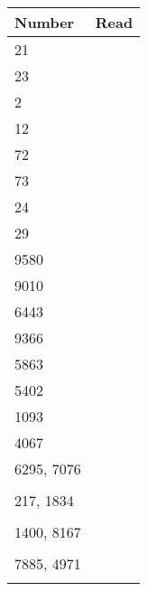 \documentclass[24pt]{article}
\begin{document}
    {
    \Large
    \begin{tabular}{ l|p{15cm} }
    
    \toprule
    Number & Read \\
    \midrule
    21 & \hfill \\
\midrule
23 & \hfill \\
\midrule
2 & \hfill \\
\midrule
12 & \hfill \\
\midrule
72 & \hfill \\
\midrule
73 & \hfill \\
\midrule
24 & \hfill \\
\midrule
29 & \hfill \\
\midrule
9580 & \hfill \\
\midrule
9010 & \hfill \\
\midrule
6443 & \hfill \\
\midrule
9366 & \hfill \\
\midrule
5863 & \hfill \\
\midrule
5402 & \hfill \\
\midrule
1093 & \hfill \\
\midrule
4067 & \hfill \\
\midrule
6295, 7076 & \hfill \\
 & \\
\midrule
217, 1834 & \hfill \\
 & \\
\midrule
1400, 8167 & \hfill \\
 & \\
\midrule
7885, 4971 & \hfill \\
 & \\
    \bottomrule
    
    \end{tabular}
    }
    
\end{document}
